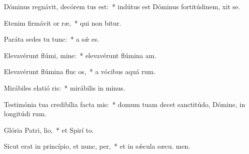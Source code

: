\item Dóminus regnávit, decórem tus est:~* indútus est Dóminus fortitúdinem,  xit se.
\item Etenim firmávit or ræ,~* qui non bitur.
\item Paráta sedes tu  tunc:~* a sǽ  es.
\item Elevavérunt flúmi, mine:~* elevavérunt flúmina  am.
\item Elevavérunt flúmina fluc os,~* a vócibus aquá rum.
\item Mirábiles elatió ris:~* mirábilis in  minus.
\item Testimónia tua credibília facta  mis:~* domum tuam decet sanctitúdo, Dómine, in longitúdi rum.
\item Glória Patri,  lio,~* et Spirí to.
\item Sicut erat in princípio, et nunc,  per,~* et in sǽcula sæcu. men.
